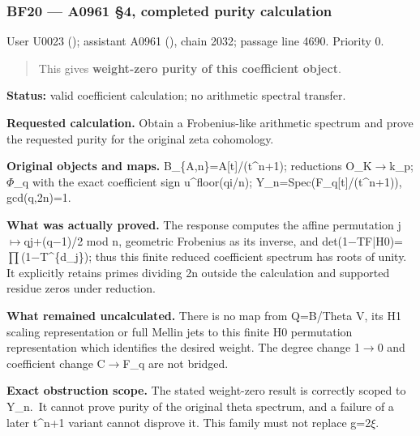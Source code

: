\documentclass[10pt,a4paper,oneside]{report}
\begin{document}
\subsubsection{BF20 --- A0961 §4, completed purity
calculation}\label{bf20-a0961-4-completed-purity-calculation}

User U0023 (\protect{});
assistant A0961 (\protect{}),
chain 2032; passage line 4690. Priority 0.

\begin{quote}
This gives \textbf{weight-zero purity of this coefficient object}.
\end{quote}

\textbf{Status:} valid coefficient calculation; no arithmetic spectral
transfer.

\textbf{Requested calculation.} Obtain a Frobenius-like arithmetic
spectrum and prove the requested purity for the original zeta
cohomology.

\textbf{Original objects and maps.} B\_\{A,n\}=A{[}t{]}/(t\^{}n+1);
reductions O\_K\allowbreak{}\ensuremath{→}\allowbreak{}k\_p;
\allowbreak{}\ensuremath{Φ}\allowbreak{}\_q with the exact coefficient
sign u\^{}floor(qi/n); Y\_n=Spec(F\_q{[}t{]}/(t\^{}n+1)), gcd(q,2n)=1.

\textbf{What was actually proved.} The response computes the affine
permutation
j\allowbreak{}\ensuremath{↦}\allowbreak{}qj+(q\allowbreak{}\ensuremath{−}\allowbreak{}1)/2
mod n, geometric Frobenius as its inverse, and
det(1\allowbreak{}\ensuremath{−}\allowbreak{}TF|H0)=\allowbreak{}\ensuremath{∏}\allowbreak{}(1\allowbreak{}\ensuremath{−}\allowbreak{}T\textasciicircum{}\{d\_j\});
thus this finite reduced coefficient spectrum has roots of unity. It
explicitly retains primes dividing 2n outside the calculation and
supported residue zeros under reduction.

\textbf{What remained uncalculated.} There is no map from Q=B/Theta V,
its H1 scaling representation or full Mellin jets to this finite H0
permutation representation which identifies the desired weight. The
degree change 1\allowbreak{}\ensuremath{→}\allowbreak{}0 and coefficient
change C\allowbreak{}\ensuremath{→}\allowbreak{}F\_q are not bridged.

\textbf{Exact obstruction scope.} The stated weight-zero result is
correctly scoped to Y\_n.~It cannot prove purity of the original theta
spectrum, and a failure of a later t\^{}n+1 variant cannot disprove it.
This family must not replace
g=2\allowbreak{}\ensuremath{ξ}\allowbreak{}.
\end{document}
